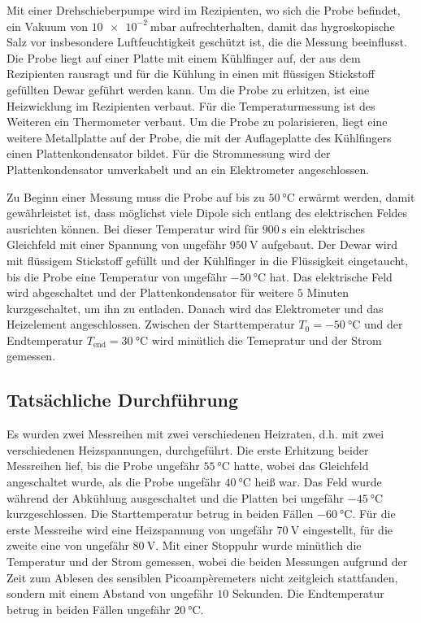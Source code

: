 Mit einer Drehschieberpumpe wird im Rezipienten, wo sich die Probe befindet, ein Vakuum von $\qty{10e-2}{\milli\bar}$ aufrechterhalten, damit das hygroskopische Salz vor insbesondere Luftfeuchtigkeit 
geschützt ist, die die Messung beeinflusst. Die Probe liegt auf einer Platte mit einem Kühlfinger auf, der aus dem Rezipienten rausragt und für die Kühlung in einen mit flüssigen Stickstoff gefüllten Dewar geführt werden kann.
Um die Probe zu erhitzen, ist eine Heizwicklung im Rezipienten verbaut. Für die Temperaturmessung ist des Weiteren ein Thermometer verbaut.
Um die Probe zu polarisieren, liegt eine weitere Metallplatte auf der Probe, die mit der Auflageplatte des Kühlfingers einen Plattenkondensator bildet. Für die Strommessung wird der Plattenkondensator
umverkabelt und an ein Elektrometer angeschlossen.

Zu Beginn einer Messung muss die Probe auf bis zu $\qty{50}{\celsius}$ erwärmt werden, damit gewährleistet ist, dass möglichst viele Dipole sich entlang des elektrischen Feldes ausrichten können.
Bei dieser Temperatur wird für $\qty{900}{\second}$ ein elektrisches Gleichfeld mit einer Spannung von ungefähr $\qty{950}{\volt}$ aufgebaut. Der Dewar wird mit flüssigem Stickstoff gefüllt und der Kühlfinger
in die Flüssigkeit eingetaucht, bis die Probe eine Temperatur von ungefähr $\qty{-50}{\celsius}$ hat. Das elektrische Feld wird abgeschaltet und der Plattenkondensator für weitere $5$ Minuten kurzgeschaltet,
um ihn zu entladen. Danach wird das Elektrometer und das Heizelement angeschlossen. Zwischen der Starttemperatur $T_0 = \qty{-50}{\celsius}$ und der Endtemperatur $T_\text{end} = \qty{30}{\celsius}$ wird minütlich die Temepratur und der Strom gemessen.

\subsection{Tatsächliche Durchführung}

Es wurden zwei Messreihen mit zwei verschiedenen Heizraten, d.h. mit zwei verschiedenen Heizspannungen, durchgeführt. Die erste Erhitzung beider Messreihen lief, bis die Probe ungefähr $\qty{55}{\celsius}$ hatte, wobei das Gleichfeld angeschaltet wurde, als die Probe ungefähr $\qty{40}{\celsius}$ heiß war.
Das Feld wurde während der Abkühlung ausgeschaltet und die Platten bei ungefähr $\qty{-45}{\celsius}$ kurzgeschlossen. Die Starttemperatur betrug in beiden Fällen $\qty{-60}{\celsius}$. Für die erste Messreihe wird eine Heizspannung von ungefähr $\qty{70}{\volt}$ eingestellt, für die zweite eine von ungefähr $\qty{80}{\volt}$. 
Mit einer Stoppuhr wurde minütlich die Temperatur und der Strom gemessen, wobei die beiden Messungen aufgrund der Zeit zum Ablesen
des sensiblen Picoampèremeters nicht zeitgleich stattfanden, sondern mit einem Abstand von ungefähr $10$ Sekunden. Die Endtemperatur betrug in beiden Fällen ungefähr $\qty{20}{\celsius}$.